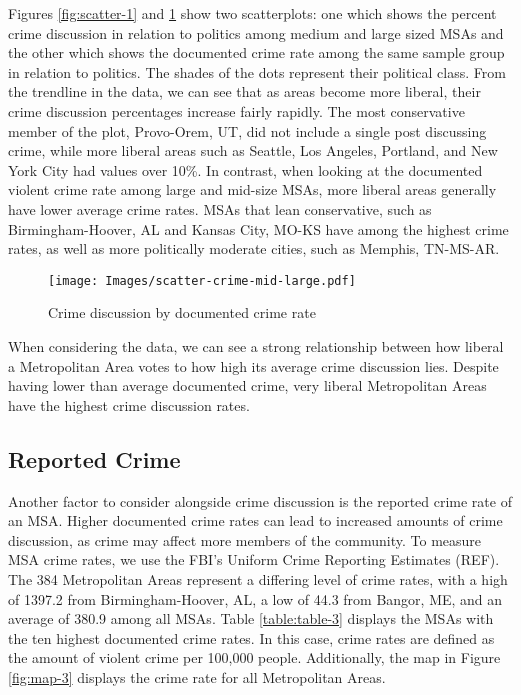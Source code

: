 \documentclass[12pt,oneside, letterpaper]{book}
\begin{document}
\par Figures \ref{fig:scatter-1} and \ref{fig:scatter-2} show two scatterplots: one which shows the percent crime discussion in relation to politics among medium and large sized MSAs and the other which shows the documented crime rate among the same sample group in relation to politics. The shades of the dots represent their political class. From the trendline in the data, we can see that as areas become more liberal, their crime discussion percentages increase fairly rapidly. The most conservative member of the plot, Provo-Orem, UT, did not include a single post discussing crime, while more liberal areas such as Seattle, Los Angeles, Portland, and New York City had values over 10\%. In contrast, when looking at the documented violent crime rate among large and mid-size MSAs, more liberal areas generally have lower average crime rates. MSAs that lean conservative, such as Birmingham-Hoover, AL and Kansas City, MO-KS have among the highest crime rates, as well as more politically moderate cities, such as Memphis, TN-MS-AR.

\begin{figure}[ht]
    \centering
    \texttt{[image: Images/scatter-crime-mid-large.pdf]}
    \caption{Crime discussion by documented crime rate}
    \label{fig:scatter-2}
\end{figure}

\par When considering the data, we can see a strong relationship between how liberal a Metropolitan Area votes to how high its average crime discussion lies. Despite having lower than average documented crime, very liberal Metropolitan Areas have the highest crime discussion rates.

\subsection{Reported Crime}

\par Another factor to consider alongside crime discussion is the reported crime rate of an MSA. Higher documented crime rates can lead to increased amounts of crime discussion, as crime may affect more members of the community. To measure MSA crime rates, we use the FBI's Uniform Crime Reporting Estimates (REF). The 384 Metropolitan Areas represent a differing level of crime rates, with a high of 1397.2 from Birmingham-Hoover, AL, a low of 44.3 from Bangor, ME, and an average of 380.9 among all MSAs. Table \ref{table:table-3} displays the MSAs with the ten highest documented crime rates. In this case, crime rates are defined as the amount of violent crime per 100,000 people. Additionally, the map in Figure \ref{fig:map-3} displays the crime rate for all Metropolitan Areas.
\end{document}
